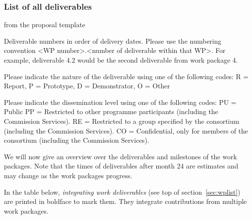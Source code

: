 \subsubsection*{List of all deliverables}\label{sec:deliverables}

\begin{todo}{from the proposal template}
\begin{compactenum}
\item Deliverable numbers in order of delivery dates. Please use the numbering convention <WP number>.<number of deliverable within
that WP>. For example, deliverable 4.2 would be the second deliverable from work package 4.
\item Please indicate the nature of the deliverable using one of the following codes:
R = Report, P = Prototype, D = Demonstrator, O = Other
\item Please indicate the dissemination level using one of the following codes:
PU = Public
PP = Restricted to other programme participants (including the Commission Services).
RE = Restricted to a group specified by the consortium (including the Commission Services).
CO = Confidential, only for members of the consortium (including the Commission Services).
\end{compactenum}
\end{todo}
We will now give an overview over the deliverables and milestones of the work
packages. Note that the times of deliverables after month 24 are estimates and may change
as the work packages progress.

In the table below, \emph{integrating work deliverables} (see top of
section~\ref{sec:wplist}) are printed in boldface to mark them. They integrate
contributions from multiple work packages.

{\footnotesize{}}

